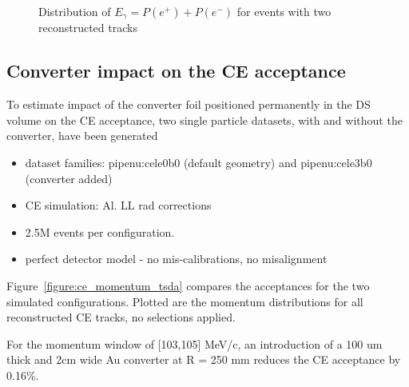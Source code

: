 \begin{figure}[H]
  \caption{
    \label{figure:t2_0_smom_1}
    Distribution of $E_\gamma = P(e^+) + P(e^-)$ for events with two reconstructed tracks
  }
\end{figure}

\newpage
\subsection{Converter impact on the CE acceptance}

To estimate impact of the converter foil positioned permanently in the DS  
volume on the CE acceptance, two single particle datasets,
with and without the converter, have been generated

\begin{itemize}
\item
  dataset families: pipenu:cele0b0 (default geometry) and pipenu:cele3b0 (converter added)
\item 
  CE simulation: Al. LL rad corrections
\item
  2.5M events per configuration.
\item 
  perfect detector model - no mis-calibrations, no misalignment
\end{itemize}

Figure~\ref{figure:ce_momentum_tsda} compares the acceptances
for the two simulated configurations.
%
Plotted are the momentum distributions for all reconstructed CE tracks,
no selections applied.

For the momentum window of [103,105] MeV/c, an introduction of a
100 um thick and 2cm wide Au converter at R = 250 mm reduces
the CE acceptance by 0.16\%.

